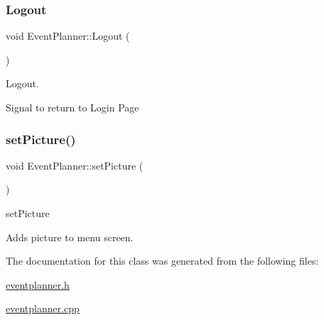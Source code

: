 \subsubsection{\texorpdfstring{Logout}{Logout}}
{\footnotesize\ttfamily void Event\+Planner\+::\+Logout (\begin{DoxyParamCaption}{ }\end{DoxyParamCaption})\hspace{0.3cm}{\ttfamily [signal]}}



Logout. 

Signal to return to Login Page \mbox{\label{class_event_planner_a2453c0478a2c0f60575e553dbea57f1e}} 
\subsubsection{\texorpdfstring{set\+Picture()}{setPicture()}}
{\footnotesize\ttfamily void Event\+Planner\+::set\+Picture (\begin{DoxyParamCaption}{ }\end{DoxyParamCaption})}



set\+Picture 

Adds picture to menu screen. 

The documentation for this class was generated from the following files\+:\begin{DoxyCompactItemize}
\item 
\hyperlink{eventplanner_8h}{eventplanner.\+h}\item 
\hyperlink{eventplanner_8cpp}{eventplanner.\+cpp}\end{DoxyCompactItemize}
